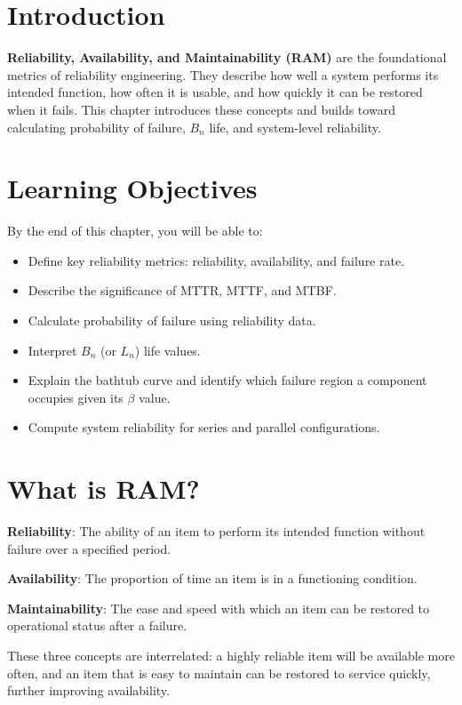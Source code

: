 \documentclass[
  letterpaper,
  DIV=11,
  numbers=noendperiod]{scrreprt}
\providecommand{\tightlist}{%
  \setlength{\itemsep}{0pt}\setlength{\parskip}{0pt}}
\begin{document}
\section{Introduction}\label{introduction}

\textbf{Reliability, Availability, and Maintainability (RAM)} are the
foundational metrics of reliability engineering. They describe how well
a system performs its intended function, how often it is usable, and how
quickly it can be restored when it fails. This chapter introduces these
concepts and builds toward calculating probability of failure, \(B_n\)
life, and system-level reliability.

\section{Learning Objectives}\label{learning-objectives}

By the end of this chapter, you will be able to:

\begin{itemize}
\tightlist
\item
  Define key reliability metrics: reliability, availability, and failure
  rate.
\item
  Describe the significance of MTTR, MTTF, and MTBF.
\item
  Calculate probability of failure using reliability data.
\item
  Interpret \(B_n\) (or \(L_n\)) life values.
\item
  Explain the bathtub curve and identify which failure region a
  component occupies given its \(\beta\) value.
\item
  Compute system reliability for series and parallel configurations.
\end{itemize}

\section{What is RAM?}\label{what-is-ram}

\textbf{Reliability}: The ability of an item to perform its intended
function without failure over a specified period.

\textbf{Availability}: The proportion of time an item is in a
functioning condition.

\textbf{Maintainability}: The ease and speed with which an item can be
restored to operational status after a failure.

These three concepts are interrelated: a highly reliable item will be
available more often, and an item that is easy to maintain can be
restored to service quickly, further improving availability.
\end{document}
